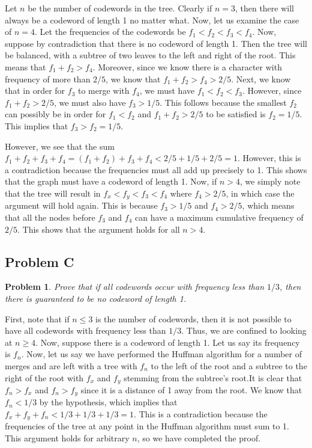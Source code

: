 \documentclass[psamsfonts]{amsart}
\newtheorem{prob}{Problem}[section]
\newenvironment{sol}{{\bfseries Solution}}{\qedsymbol}
\theoremstyle{definition}
\theoremstyle{remark}
\numberwithin{equation}{section}
\begin{document}
\begin{sol}
Let $n$ be the number of codewords in the tree. Clearly if $n=3$, then there will always be a codeword of length 1 no matter what. Now, let us examine the case of $n = 4$. Let the frequencies of the codewords be $f_1 < f_2 < f_3 < f_4$. Now, suppose by contradiction that there is no codeword of length 1. Then the tree will be balanced, with a subtree of two leaves to the left and right of the root. This means that $f_1 + f_2 > f_4$. Moreover, since we know there is a character with frequency of more than $2/5$, we know that $f_1 + f_2 > f_4 > 2/5$. Next, we know that in order for $f_3$ to merge with $f_4$, we must have $f_1 < f_2 < f_3$. However, since $f_1 + f_2 > 2/5$, we must also have $f_3 > 1/5$. This follows because the smallest $f_2$ can possibly be in order for $f_1 < f_2$ and $f_1 + f_2 > 2/5$ to be satisfied is $f_2 = 1/5$. This implies that $f_3 > f_2 = 1/5$.

However, we see that the sum $f_1 + f_2 + f_3 + f_4 = (f_1 + f_2) + f_3 + f_4 < 2/5 + 1/5 + 2/5 = 1$. However, this is a contradiction because the frequencies must all add up precisely to 1. This shows that the graph must have a codeword of length 1. Now, if $n > 4$, we simply note that the tree will result in $f_x < f_y < f_3 < f_4$ where $f_4 > 2/5$, in which case the argument will hold again. This is because $f_3 > 1/5$ and $f_4 > 2/5$, which means that all the nodes before $f_3$ and $f_4$ can have a maximum cumulative frequency of $2/5$. This shows that the argument holds for all $n > 4$. 
\end{sol}

\subsection{Problem C}

\begin{prob}
Prove that if all codewords occur with frequency less than $1/3$, then there is guaranteed to be no codeword of length 1.
\end{prob}

\begin{sol}
First, note that if $n \leq 3$ is the number of codewords, then it is not possible to have all codewords with frequency less than $1/3$. Thus, we are confined to looking at $n \geq 4$. Now, suppose there is a codeword of length 1. Let us say its frequency is $f_n$. Now, let us say we have performed the Huffman algorithm for a number of merges and are left with a tree with $f_n$ to the left of the root and a subtree to the right of the root with $f_x$ and $f_y$ stemming from the subtree's root.It is clear that $f_n > f_x$ and $f_n > f_y$ since it is a distance of 1 away from the root.  We know that $f_n < 1/3$ by the hypothesis, which implies that $f_x + f_y + f_n < 1/3 + 1/3 + 1/3 = 1$. This is a contradiction because the frequencies of the tree at any point in the Huffman algorithm must sum to 1. This argument holds for arbitrary $n$, so we have completed the proof.
\end{sol}
\end{document}
